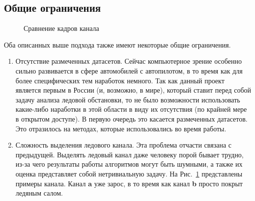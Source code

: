 \subsection{Общие ограничения}
\begin{figure}[htbp]
    \centering
    \caption{Сравнение кадров канала}\label{fig:closed channel}
\end{figure}
Оба описанных выше подхода также имеют некоторые общие ограничения.
\begin{enumerate}
    \item Отсутствие размеченных датасетов. Сейчас компьютерное зрение особенно сильно развивается в сфере автомобилей с автопилотом, в то время как для более специфических тем наработок немного. 
    Так как данный проект является первым в России (и, возможно, в мире), который ставит перед собой задачу анализа ледовой обстановки, 
    то не было возможности использовать какие-либо наработки в этой области в виду их отсутствия (по крайней мере в открытом доступе). В первую очередь это касается размеченных датасетов. 
    Это отразилось на методах, которые использовались во время работы.
    \item Сложность выделения ледового канала. Эта проблема отчасти связана с предыдущей. Выделять ледовый канал даже человеку порой бывает трудно, из-за чего результаты
    работы алгоритмов могут быть шумными, а также их оценка представляет собой нетривиальную задачу. На Рис.~\ref{fig:closed channel} представлены примеры канала. 
    Канал \textbf{a} уже зарос, в то время как канал \textbf{b} просто покрыт ледяным салом.
\end{enumerate} 

